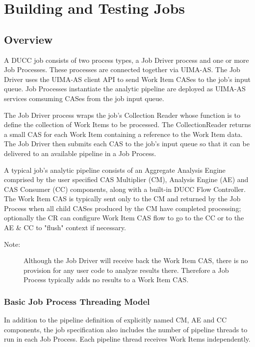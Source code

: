 \chapter{Building and Testing Jobs}
\section{Overview}

A DUCC job consists of two process types, a Job Driver process and one or more
Job Processes. These processes are connected together via UIMA-AS.
The Job Driver uses the UIMA-AS client API to send Work Item CASes 
to the job's input queue. Job Processes instantiate the analytic pipeline are deployed
as UIMA-AS services comsuming CASes from the job input queue.

The Job Driver process wraps the job's Collection Reader whose
function is to define the collection of Work Items to be processed.
The CollectionReader returns a small CAS for each Work Item containing a
reference to the Work Item data. The Job Driver then submits each CAS to the job's
input queue so that it can be delivered to an available pipeline in a Job Process.

A typical job's analytic pipeline consists of an Aggregate Analysis Engine comprised by
the user specified CAS Multiplier (CM), Analysis Engine (AE) and CAS
Consumer (CC) components, along with a built-in DUCC Flow Controller.
The Work Item CAS is typically sent only to the CM and returned by
the Job Process when all child CASes produced by the CM have completed
processing; optionally the CR can configure Work Item CAS flow to go to the CC 
or to the AE \& CC to "flush" context if necessary. 

	\begin{description}
	    \item[Note:] Although the Job Driver will receive back the Work Item CAS, 
	    there is no provision for any user code to analyze results there. Therefore a
		Job Process typically adds no results to a Work Item CAS.
	\end{description}

   \subsection{Basic Job Process Threading Model}
   In addition to the pipeline definition of explicitly named CM, AE and CC components, the job
   specification also includes the number of pipeline threads to run in each
   Job Process. Each pipeline thread receives Work Items independently.

